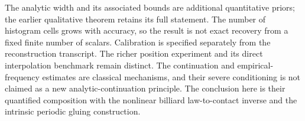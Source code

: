 The analytic width and its associated bounds are additional quantitative
priors; the earlier qualitative theorem retains its full statement.  The
number of histogram cells grows with accuracy, so the result is not exact
recovery from a fixed finite number of scalars.  Calibration is specified
separately from the reconstruction transcript.  The richer position experiment
and its direct interpolation benchmark remain distinct.  The continuation
and empirical-frequency estimates are classical mechanisms, and their severe
conditioning is not claimed as a new analytic-continuation principle.  The
conclusion here is their quantified composition with the nonlinear billiard
law-to-contact inverse and the intrinsic periodic gluing construction.

